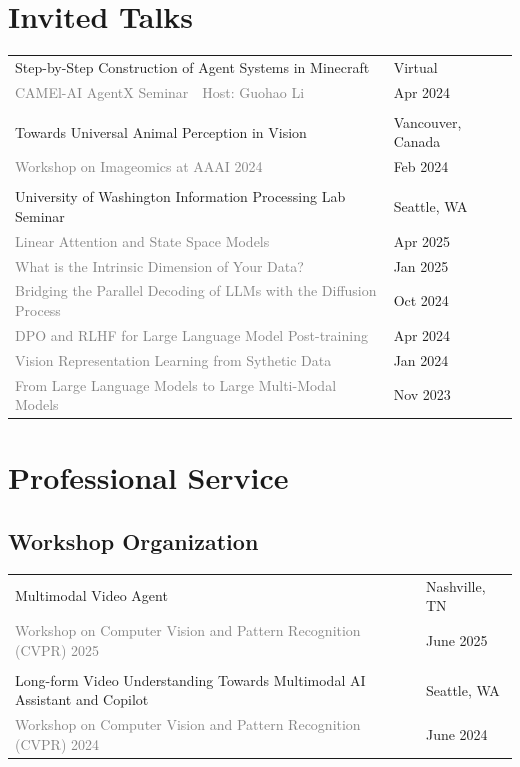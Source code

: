 \documentclass[a4paper,11pt]{article}
\newcommand{\sepspace}{\vspace{6pt}}
\begin{document}
\section*{Invited Talks}
\begin{tabular}{p{14cm}@{\hspace{1em}}!{\textcolor{lightgray}{\vrule width 0.5pt}}@{\hspace{1em}}l}
    Step-by-Step Construction of Agent Systems in Minecraft & Virtual \\
    \textcolor{gray}{CAMEl-AI AgentX Seminar~~Host: Guohao Li} & Apr 2024 \\
    & \\
    Towards Universal Animal Perception in Vision & Vancouver, Canada \\
    \textcolor{gray}{Workshop on Imageomics at AAAI 2024} & Feb 2024 \\
    & \\
    University of Washington Information Processing Lab Seminar & Seattle, WA \\
    \textcolor{gray}{Linear Attention and State Space Models} & Apr 2025 \\
    \textcolor{gray}{What is the Intrinsic Dimension of Your Data?} & Jan 2025 \\
    \textcolor{gray}{Bridging the Parallel Decoding of LLMs with the Diffusion Process} & Oct 2024 \\
    \textcolor{gray}{DPO and RLHF for Large Language Model Post-training} & Apr 2024 \\
    \textcolor{gray}{Vision Representation Learning from Sythetic Data} & Jan 2024 \\
    \textcolor{gray}{From Large Language Models to Large Multi-Modal Models} & Nov 2023 \\ 
\end{tabular}


\sepspace
\section*{Professional Service}

\subsection*{Workshop Organization}
\begin{tabular}{p{14cm}@{\hspace{1em}}!{\textcolor{lightgray}{\vrule width 0.5pt}}@{\hspace{1em}}l}
    Multimodal Video Agent & Nashville, TN \\ 
    \textcolor{gray}{Workshop on Computer Vision and Pattern Recognition (CVPR) 2025} & June 2025 \\
    & \\
    Long-form Video Understanding Towards Multimodal AI Assistant and Copilot & Seattle, WA \\ 
    \textcolor{gray}{Workshop on Computer Vision and Pattern Recognition (CVPR) 2024} & June 2024

\end{tabular}
\end{document}
